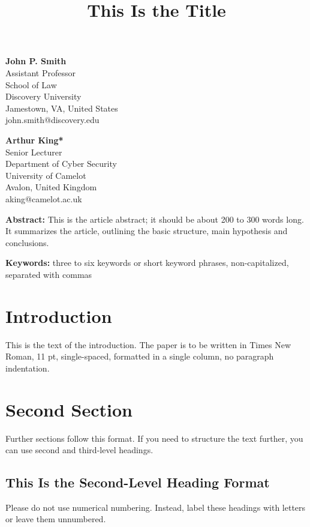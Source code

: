 \documentclass[11pt]{article}
\title{This Is the Title}
\author{}
\date{}
\begin{document}
\maketitle

\vspace{-2em}
\begin{multicols}{2}
\noindent
\textbf{John P. Smith} \\
Assistant Professor \\
School of Law \\
Discovery University \\
Jamestown, VA, United States \\
john.smith@discovery.edu

\vfill\null
\columnbreak

\noindent
\textbf{Arthur King*} \\
Senior Lecturer \\
Department of Cyber Security \\
University of Camelot \\
Avalon, United Kingdom \\
aking@camelot.ac.uk
\end{multicols}

\vspace{1em}

\noindent\textbf{Abstract:} This is the article abstract; it should be about 200 to 300 words long. It summarizes the article, outlining the basic structure, main hypothesis and conclusions.

\vspace{1em}

\noindent\textbf{Keywords:} three to six keywords or short keyword phrases, non-capitalized, separated with commas

\section{Introduction}
This is the text of the introduction. The paper is to be written in Times New Roman, 11 pt, single-spaced, formatted in a single column, no paragraph indentation.

\section{Second Section}
Further sections follow this format. If you need to structure the text further, you can use second and third-level headings.

\subsection{This Is the Second-Level Heading Format}
Please do not use numerical numbering. Instead, label these headings with letters or leave them unnumbered.
\end{document}
